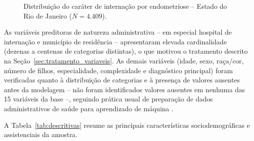 \documentclass[12pt,a4paper]{article}
\begin{document}
\begin{figure}[H]
\centering
{}
\caption{Distribuição do caráter de internação por endometriose -- Estado do Rio de Janeiro ($N=4.409$).}
\label{fig:dist_resposta}
\end{figure}

As variáveis preditoras de natureza administrativa -- em especial hospital de internação e município de residência -- apresentaram elevada cardinalidade (dezenas a centenas de categorias distintas), o que motivou o tratamento descrito na Seção~\ref{sec:tratamento_variaveis}. As demais variáveis (idade, sexo, raça/cor, número de filhos, especialidade, complexidade e diagnóstico principal) foram verificadas quanto à distribuição de categorias e à presença de valores ausentes antes da modelagem -- não foram identificados valores ausentes em nenhuma das 15 variáveis da base --, seguindo prática usual de preparação de dados administrativos de saúde para aprendizado de máquina \cite{santos2019}.

A Tabela~\ref{tab:descritivas} resume as principais características sociodemográficas e assistenciais da amostra.
\end{document}
